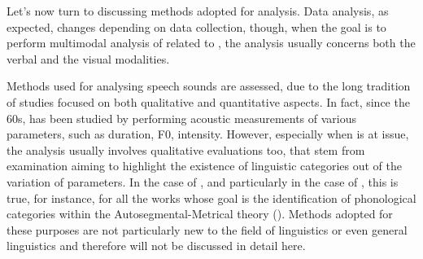 \documentclass[output=paper]{langsci/langscibook}
\begin{document}
Let’s now turn to discussing methods adopted for analysis. Data analysis, as expected, changes depending on data collection, though, when the goal is to perform multimodal analysis of  related to , the analysis usually concerns both the verbal and the visual modalities. 

Methods used for analysing speech sounds are assessed, due to the long tradition of studies focused on both qualitative and quantitative aspects. In fact, since the 60s,  has been studied by performing acoustic measurements of various parameters, such as duration, F0, intensity. However, especially when  is at issue, the analysis usually involves qualitative evaluations too, that stem from examination aiming to highlight the existence of linguistic categories out of the variation of  parameters. In the case of , and particularly in the case of , this is true, for instance, for all the works whose goal is the identification of phonological categories within the Autosegmental-Metrical theory (\citealt{Pierrehumbert1980,Ladd.1996,Beckman1997}). Methods adopted for these purposes are not particularly new to the field of  linguistics or even general linguistics and therefore will not be discussed in detail here. 
\end{document}
